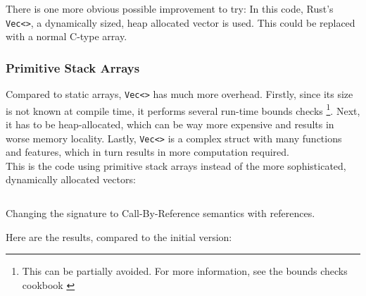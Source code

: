 There is one more obvious possible improvement to try: In this code, Rust's \texttt{Vec<>}, a dynamically sized, heap allocated vector is used. This could be replaced with a normal C-type array.

\subsubsection{Primitive Stack Arrays}
Compared to static arrays, \texttt{Vec<>} has much more overhead. Firstly, since its size is not known at compile time, it performs several run-time bounds checks \footnote{This can be partially avoided. For more information, see the bounds checks cookbook \cite{bounds_cookbook}}. Next, it has to be heap-allocated, which can be way more expensive and results in worse memory locality. Lastly, \texttt{Vec<>} is a complex struct with many functions and features, which in turn results in more computation required.\\

This is the code using primitive stack arrays instead of the more sophisticated, dynamically allocated vectors:

\begin{listing}[H]
  \inputminted{rust}{./assets/array.rs}
\caption{Changing the signature to Call-By-Reference semantics with references.}
\end{listing}

Here are the results, compared to the initial version:

